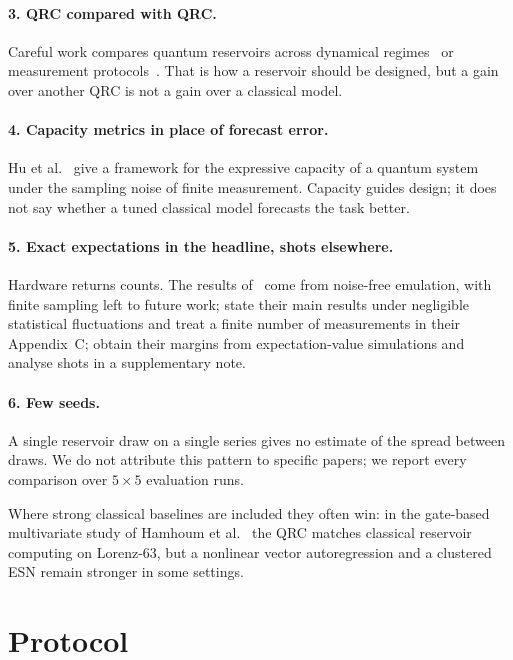 \documentclass[11pt,a4paper]{article}
\begin{document}
\paragraph{3. QRC compared with QRC.} Careful work compares quantum reservoirs across dynamical
regimes~\cite{martinezpena2021} or measurement protocols~\cite{mujal2023}. That is how a reservoir
should be designed, but a gain over another QRC is not a gain over a classical model.

\paragraph{4. Capacity metrics in place of forecast error.} Hu et al.~\cite{hu2023} give a framework
for the expressive capacity of a quantum system under the sampling noise of finite measurement.
Capacity guides design; it does not say whether a tuned classical model forecasts the task better.

\paragraph{5. Exact expectations in the headline, shots elsewhere.} Hardware returns counts. The
results of~\cite{ahmed2024} come from noise-free emulation, with finite sampling left to future
work; \cite{kobayashi2024} state their main results under negligible statistical fluctuations and
treat a finite number of measurements in their Appendix~C; \cite{nguyen2026} obtain their margins
from expectation-value simulations and analyse shots in a supplementary note.

\paragraph{6. Few seeds.} A single reservoir draw on a single series gives no estimate of the
spread between draws. We do not attribute this pattern to specific papers; we report every
comparison over $5\times5$ evaluation runs.

Where strong classical baselines are included they often win: in the gate-based multivariate study of
Hamhoum et al.~\cite{hamhoum2025} the QRC matches classical reservoir computing on Lorenz-63, but a
nonlinear vector autoregression and a clustered ESN remain stronger in some settings.

\section{Protocol}
\label{sec:protocol}
\end{document}
